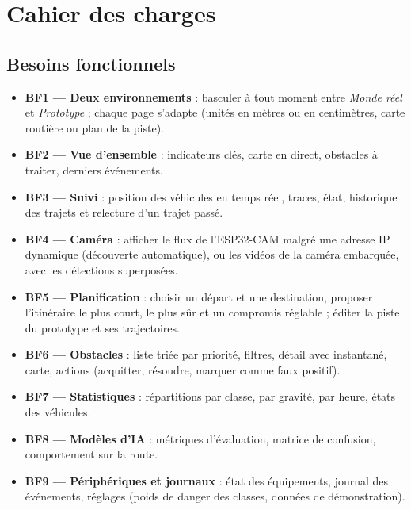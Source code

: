 \section{Cahier des charges}

\subsection*{Besoins fonctionnels}
\begin{itemize}
  \item \textbf{BF1 — Deux environnements} : basculer à tout moment entre \emph{Monde réel} et \emph{Prototype} ;
        chaque page s'adapte (unités en mètres ou en centimètres, carte routière ou plan de la piste).
  \item \textbf{BF2 — Vue d'ensemble} : indicateurs clés, carte en direct, obstacles à traiter, derniers
        événements.
  \item \textbf{BF3 — Suivi} : position des véhicules en temps réel, traces, état, historique des trajets et
        relecture d'un trajet passé.
  \item \textbf{BF4 — Caméra} : afficher le flux de l'ESP32-CAM malgré une adresse IP dynamique (découverte
        automatique), ou les vidéos de la caméra embarquée, avec les détections superposées.
  \item \textbf{BF5 — Planification} : choisir un départ et une destination, proposer l'itinéraire le plus court,
        le plus sûr et un compromis réglable ; éditer la piste du prototype et ses trajectoires.
  \item \textbf{BF6 — Obstacles} : liste triée par priorité, filtres, détail avec instantané, carte, actions
        (acquitter, résoudre, marquer comme faux positif).
  \item \textbf{BF7 — Statistiques} : répartitions par classe, par gravité, par heure, états des véhicules.
  \item \textbf{BF8 — Modèles d'IA} : métriques d'évaluation, matrice de confusion, comportement sur la route.
  \item \textbf{BF9 — Périphériques et journaux} : état des équipements, journal des événements, réglages
        (poids de danger des classes, données de démonstration).
\end{itemize}

